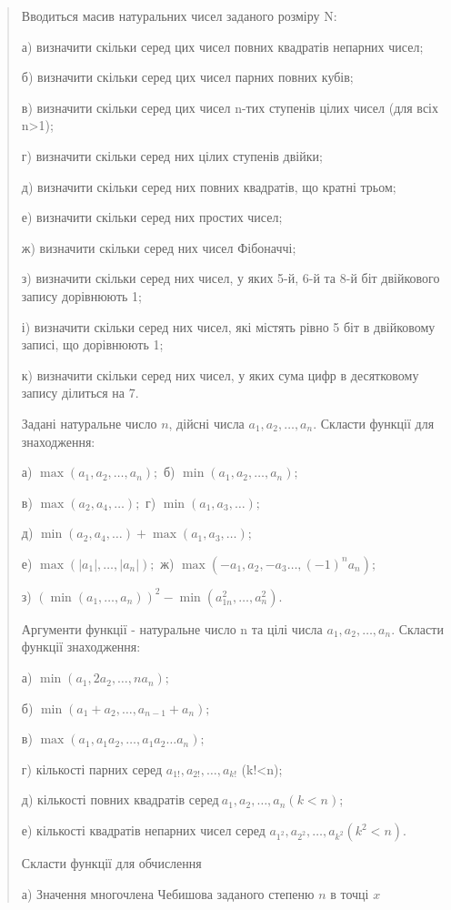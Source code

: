 \documentclass[]{article}
\begin{document}
\begin{quote}
Вводиться масив натуральних чисел заданого розміру N:

а) визначити скільки серед цих чисел повних квадратів непарних чисел;

б) визначити скільки серед цих чисел парних повних кубів;

в) визначити скільки серед цих чисел n-тих ступенів цілих чисел (для
всіх n\textgreater{}1);

г) визначити скільки серед них цілих ступенів двійки;

д) визначити скільки серед них повних квадратів, що кратні трьом;

е) визначити скільки серед них простих чисел;

ж) визначити скільки серед них чисел Фібоначчі;

з) визначити скільки серед них чисел, у яких 5-й, 6-й та 8-й біт
двійкового запису дорівнюють 1;

і) визначити скільки серед них чисел, які містять рівно 5 біт в
двійковому записі, що дорівнюють 1;

к) визначити скільки серед них чисел, у яких сума цифр в десятковому
запису ділиться на 7.

Задані натуральне число \(n\), дійсні числа
\(a_{1},a_{2},\ldots,a_{n}.\) Скласти функції для знаходження:

\protect\hypertarget{_Hlk65245410}{}{}а)
\(\max\left( a_{1},a_{2},\ldots,a_{n} \right);\) б)
\(\min\left( a_{1},a_{2},\ldots,a_{n} \right);\)

в) \(\max\left( a_{2},a_{4},\ldots \right);\) г)
\(\min\left( a_{1},a_{3},\ldots \right);\)

д)
\(\min\left( a_{2},a_{4},\ldots \right) + \max\left( a_{1},a_{3},\ldots \right);\)

е)
\(\max\left( \left| a_{1} \right|,\ldots,\left| a_{n} \right| \right);\)
ж) \(\max\left( - a_{1},a_{2}, - a_{3}\ldots,( - 1)^{n}a_{n} \right);\)

з)
\(\left( \min\left( a_{1},\ldots,a_{n} \right) \right)^{2} - \min\left( a_{1n}^{2},\ldots,a_{n}^{2} \right).\)

Аргументи функції - натуральне число n та цілі числа
\(a_{1},a_{2},\ldots,a_{n}.\) Скласти функції знаходження:

а) \(\min\left( a_{1},2a_{2},\ldots,na_{n} \right);\)

б) \(\min\left( a_{1} + a_{2},\ldots,a_{n - 1} + a_{n} \right);\)

в)
\(\max\left( a_{1},a_{1}a_{2},\ldots,a_{1}a_{2}\ldots a_{n} \right);\)

г) кількості парних серед \(a_{1!},a_{2!},\ldots,a_{k!}\)
(k!\textless{}n);

д) кількості повних квадратів
серед\(\ a_{1},a_{2},\ldots,a_{n}(k < n)\);

е) кількості квадратів непарних чисел серед
\(a_{1^{2}},a_{2^{2}},\ldots,a_{k^{2}}(k^{2} < n).\)

Скласти функції для обчислення

а) Значення многочлена Чебишова заданого степеню \(n\) в точці \(x\)
\end{quote}
\end{document}
